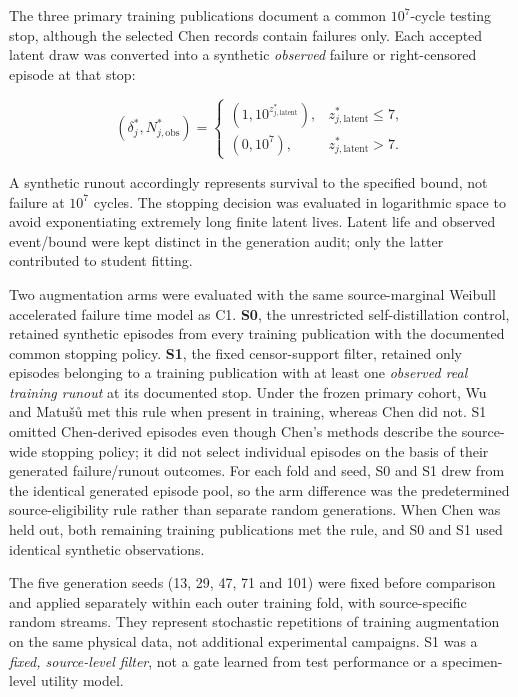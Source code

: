 \documentclass[12pt,a4paper]{article}
\begin{document}
The three primary training publications document a common \(10^7\)-cycle testing stop, although the selected Chen records contain failures only. Each accepted latent draw was converted into a synthetic \emph{observed} failure or right-censored episode at that stop:

\begin{equation}
(\delta_j^{*},N_{j,\mathrm{obs}}^{*})
=
\begin{cases}
(1,10^{z_{j,\mathrm{latent}}^{*}}),
& z_{j,\mathrm{latent}}^{*}\leq 7,\\[2pt]
(0,10^7),
& z_{j,\mathrm{latent}}^{*}>7.
\end{cases}
\tag{2.5c}
\end{equation}

A synthetic runout accordingly represents survival to the specified bound, not failure at \(10^7\) cycles. The stopping decision was evaluated in logarithmic space to avoid exponentiating extremely long finite latent lives. Latent life and observed event/bound were kept distinct in the generation audit; only the latter contributed to student fitting.

Two augmentation arms were evaluated with the same source-marginal Weibull accelerated failure time model as C1. \textbf{S0}, the unrestricted self-distillation control, retained synthetic episodes from every training publication with the documented common stopping policy. \textbf{S1}, the fixed censor-support filter, retained only episodes belonging to a training publication with at least one \emph{observed real training runout} at its documented stop. Under the frozen primary cohort, Wu and Matušů met this rule when present in training, whereas Chen did not. S1 omitted Chen-derived episodes even though Chen's methods describe the source-wide stopping policy; it did not select individual episodes on the basis of their generated failure/runout outcomes. For each fold and seed, S0 and S1 drew from the identical generated episode pool, so the arm difference was the predetermined source-eligibility rule rather than separate random generations. When Chen was held out, both remaining training publications met the rule, and S0 and S1 used identical synthetic observations.

The five generation seeds (13, 29, 47, 71 and 101) were fixed before comparison and applied separately within each outer training fold, with source-specific random streams. They represent stochastic repetitions of training augmentation on the same physical data, not additional experimental campaigns. S1 was a \emph{fixed, source-level filter}, not a gate learned from test performance or a specimen-level utility model.
\end{document}
